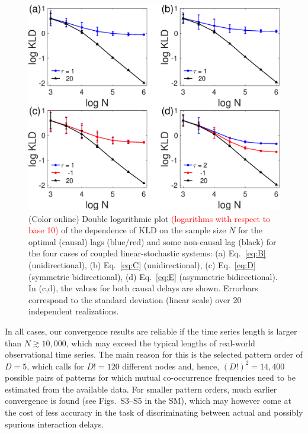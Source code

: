 \documentclass[12pt,aip,cha,reprint,nofootinbib]{revtex4-1}
\begin{document}
\begin{figure}
	\centering
	\includegraphics[width=\columnwidth]{kld_lengthBCDE.eps}
\caption{(Color online) Double logarithmic plot \textcolor{red}{(logarithms with respect to base 10)} of the dependence of KLD on the sample size $N$ for the optimal (causal) lags (blue/red) and some non-causal lag (black) for the four cases of coupled linear-stochastic systems: (a) Eq.~\eqref{eq:B} (unidirectional), (b) Eq.~\eqref{eq:C} (unidirectional), (c) Eq.~\eqref{eq:D} (symmetric bidirectional), (d) Eq.~\eqref{eq:E} (asymmetric bidirectional). In (c,d), the values for both causal delays are shown. Errorbars correspond to the standard deviation (linear scale) over 20 independent realizations.  \label{fig:sampleSizeBCDE}}
\end{figure}

{\color{red}In all cases, our convergence results are reliable if the time series length is larger than $N \gtrsim 10,000$, which may exceed the typical lengths of real-world observational time series. The main reason for this is the selected pattern order of $D=5$, which calls for $D!=120$ different nodes and, hence, $(D!)^2=14,400$ possible pairs of patterns for which mutual co-occurrence frequencies need to be estimated from the available data. For smaller pattern orders, much earlier convergence is found (see Figs.~S3--S5 in the SM), which may however come at the cost of less accuracy in the task of discriminating between actual and possibly spurious interaction delays.}  
\end{document}
